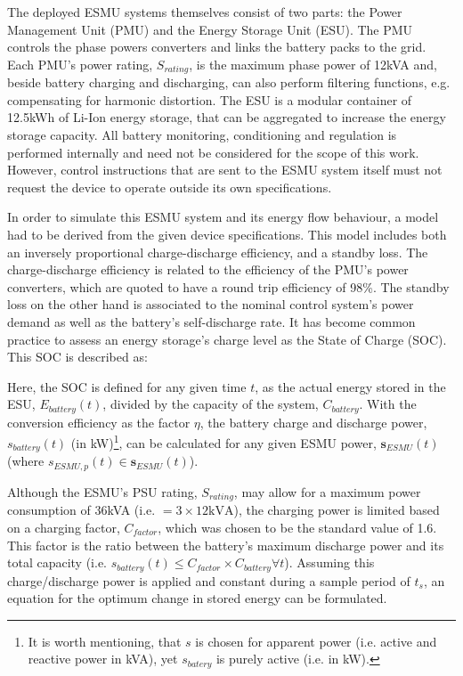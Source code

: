 The deployed ESMU systems themselves consist of two parts: the Power Management Unit (PMU) and the Energy Storage Unit (ESU).
The PMU controls the phase powers converters and links the battery packs to the grid.
Each PMU's power rating, $S_{rating}$, is the maximum phase power of 12kVA and, beside battery charging and discharging, can also perform filtering functions, e.g. compensating for  harmonic distortion.
The ESU is a modular container of 12.5kWh of Li-Ion energy storage, that can be aggregated to increase the energy storage capacity.
All battery monitoring, conditioning and regulation is performed internally and need not be considered for the scope of this work.
However, control instructions that are sent to the ESMU system itself must not request the device to operate outside its own specifications.

In order to simulate this ESMU system and its energy flow behaviour, a model had to be derived from the given device specifications.
This model includes both an inversely proportional charge-discharge efficiency, and a standby loss.
The charge-discharge efficiency is related to the efficiency of the PMU's power converters, which are quoted to have a round trip efficiency of 98\%.
The standby loss on the other hand is associated to the nominal control system's power demand as well as the battery's self-discharge rate.
It has become common practice to assess an energy storage's charge level as the State of Charge (SOC).
This SOC is described as:



Here, the SOC is defined for any given time $t$, as the actual energy stored in the ESU, $E_{battery}(t)$, divided by the capacity of the system, $C_{battery}$.
With the conversion efficiency as the factor $\eta$, the battery charge and discharge power, $s_{battery}(t)$ (in kW)\footnote[1]{It is worth mentioning, that $s$ is chosen for apparent power (i.e. active and reactive power in kVA), yet $s_{batery}$ is purely active (i.e. in kW).}, can be calculated for any given ESMU power, $\textbf{s}_{ESMU}(t)$ (where $s_{ESMU,p}(t) \in \textbf{s}_{ESMU}(t)$).



Although the ESMU's PSU rating, $S_{rating}$, may allow for a maximum power consumption of 36kVA (i.e. $=3\times12\text{kVA}$), the charging power is limited based on a charging factor, $C_{factor}$, which was chosen to be the standard value of 1.6.
This factor is the ratio between the battery's maximum discharge power and its total capacity (i.e. $s_{battery}(t) \leq C_{factor}\times C_{battery} \forall t$).
Assuming this charge/discharge power is applied and constant during a sample period of $t_s$, an equation for the optimum change in stored energy can be formulated.

